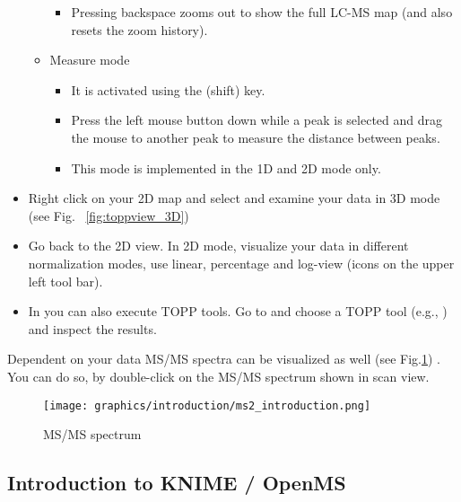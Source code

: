 \begin{itemize}
\begin{itemize}
\begin{itemize}
        \item Pressing backspace \keys{\, \backspace \,\,} zooms out to show the full LC-MS map (and also resets the zoom history).
        \end{itemize}
    \item Measure mode
        \begin{itemize}
        \item It is activated using the \keys{\, \shift \,\,\, } (shift) key.
        \item Press the left mouse button down while a peak is selected and drag the mouse to
        			another peak to measure the distance between peaks.
        \item This mode is implemented in the 1D and 2D mode only.
        \end{itemize}
    \end{itemize}
\item Right click on your 2D map and select  and examine your
			data in 3D mode (see Fig. ~\ref{fig:toppview_3D})
\item Go back to the 2D view. In 2D mode, visualize your data in different normalization modes, use linear, percentage and log-view (icons on the upper left tool bar).
\item In  you can also execute TOPP tools. Go to
			 and choose a TOPP tool (e.g., ) and
			inspect the results.
\end{itemize}

\noindent Dependent on your data MS/MS spectra can be visualized as well (see Fig.\ref{fig:ms2}) . You can do so, by double-click on the MS/MS spectrum shown in scan view.
\newline
\begin{figure}[!htb]
\texttt{[image: graphics/introduction/ms2\_introduction.png]}
\caption{MS/MS spectrum}
\label{fig:ms2}
\end{figure}



\subsection{Introduction to KNIME / OpenMS}
\label{KNIME_Intro}

